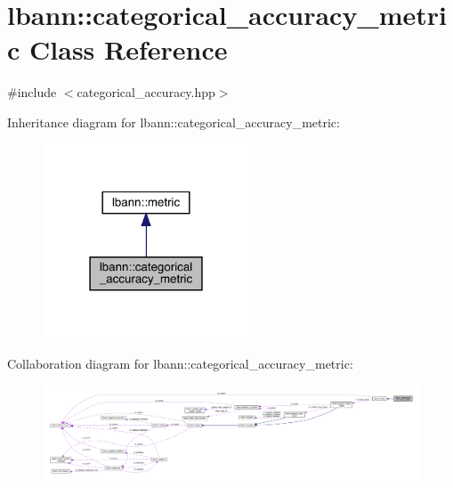 \hypertarget{classlbann_1_1categorical__accuracy__metric}{}\section{lbann\+:\+:categorical\+\_\+accuracy\+\_\+metric Class Reference}
\label{classlbann_1_1categorical__accuracy__metric}


{\ttfamily \#include $<$categorical\+\_\+accuracy.\+hpp$>$}



Inheritance diagram for lbann\+:\+:categorical\+\_\+accuracy\+\_\+metric\+:\nopagebreak
\begin{figure}[H]
\begin{center}
\leavevmode
\includegraphics[width=174pt]{classlbann_1_1categorical__accuracy__metric__inherit__graph}
\end{center}
\end{figure}


Collaboration diagram for lbann\+:\+:categorical\+\_\+accuracy\+\_\+metric\+:\nopagebreak
\begin{figure}[H]
\begin{center}
\leavevmode
\includegraphics[width=350pt]{classlbann_1_1categorical__accuracy__metric__coll__graph}
\end{center}
\end{figure}
